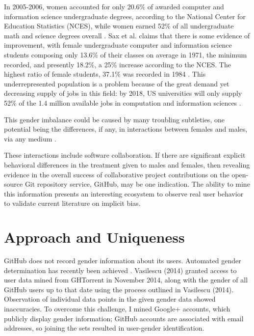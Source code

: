 \documentclass[authoryear]{sigplanconf}
\begin{document}
In 2005-2006, women accounted for only 20.6\% of awarded computer and information
science undergraduate degrees, according to the National Center for Education
Statistics (NCES), while women earned 52\% of all undergraduate
math and science degrees overall \citep{genderdiversitycomputing}.
Sax et al. claims that there is some evidence of improvement, with female
undergraduate computer and information science students composing only 13.6\% of
their classes on average in 1971, the minimum recorded, and presently 18.2\%, a
25\% increase according to the NCES. The highest ratio of female students,
37.1\% was recorded in 1984 \citep{evolutionofwomen}.
This underrepresented population is a problem because of the great demand yet
decreasing supply of jobs in this field: by 2018, US universities will only
supply 52\% of the 1.4 million available jobs in computation and information
sciences \citep{genderdiversitycomputing}.

This gender imbalance could be caused by many troubling subtleties,
one potential being the differences, if any, in interactions
between females and males, via any medium \citep{implicitbias}.

These interactions include software 
collaboration. If there are significant explicit behavioral differences in the
treatment given to males and females, then revealing evidence in the overall success of
collaborative project contributions on the open-source Git
repository service, GitHub, may be one indication. The ability to mine this information
presents an interesting ecosystem to observe real user behavior to validate current
literature on implicit bias.

\section{Approach and Uniqueness}

GitHub does not record gender information about its users. Automated gender
determination has recently been achieved \cite{VasilescuIWC13}.
Vasilescu (2014) granted access to user data mined from GHTorrent in November 2014,
along with the gender of all GitHub users up to that date using the process
outlined in Vasilescu (2014). Observation of individual data points in the given
gender data showed inaccuracies. To overcome this challenge, I mined Google+
accounts, which publicly display gender information; GitHub accounts are
associated with email addresses, so joining the sets resulted in user-gender
identification.
\end{document}
